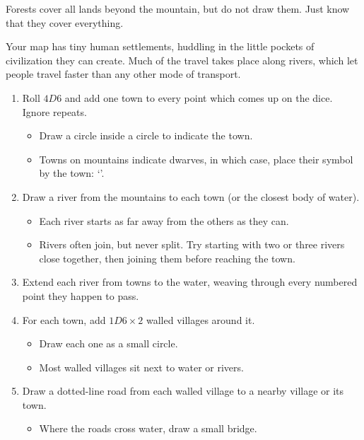 \begin{multicols}{2}
Forests cover all lands beyond the mountain, but do not draw them. Just
know that they cover everything.


Your map has tiny human settlements, huddling in the little pockets of civilization they can create.
Much of the travel takes place along rivers, which let people travel faster than any other mode of transport.

\begin{enumerate}
\item
  Roll $4D6$ and add one town to every point which comes up on the dice.
  Ignore repeats.

  \begin{itemize}
  \item
    Draw a circle inside a circle to indicate the town.
  \item
    Towns on mountains indicate dwarves, in which case, place their symbol by the town: `\Dw'.
  \end{itemize}
  \item
  Draw a river from the mountains to each town (or the closest body of water).
  \begin{itemize}
  \item
    Each river starts as far away from the others as they can.
  \item
    Rivers often join, but never split.
    Try starting with two or three rivers close together, then joining them before reaching the town.
  \end{itemize}
  \item
  Extend each river from towns to the water, weaving through every numbered point they happen to pass.
  \item
  For each town, add $1D6 \times 2$ walled villages around it.
  \begin{itemize}
    \item
    Draw each one as a small circle.
    \item
    Most walled villages sit next to water or rivers.
  \end{itemize}
  \item
  Draw a dotted-line road from each walled village to a nearby village or its town.
  \begin{itemize}
    \item
    Where the roads cross water, draw a small bridge.
  \end{itemize}
\end{enumerate}


\end{multicols}
